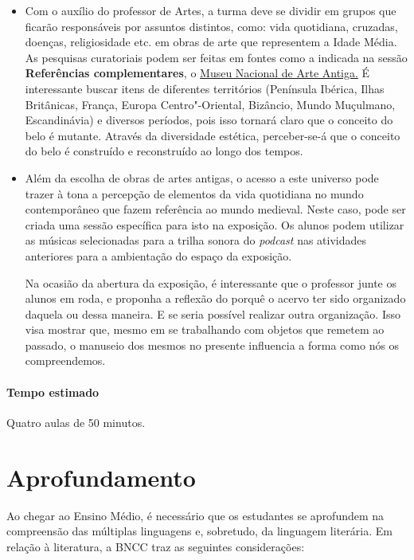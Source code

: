 \documentclass[12pt]{extarticle}
\begin{document}
\begin{itemize}

 		\item
 		Com o auxílio do professor de Artes, a turma deve se dividir em grupos
 		que ficarão responsáveis por assuntos distintos, como: vida quotidiana, 
 		cruzadas, doenças, religiosidade etc. em obras de arte que representem a Idade Média. 
 		As pesquisas curatoriais podem ser feitas em fontes como a indicada na 
 		sessão \textbf{Referências complementares}, o \href{https://artsandculture.google.com/partner/national-museum-of-ancient-art}{Museu Nacional de Arte Antiga.} 
 		É interessante buscar itens de diferentes territórios (Península
		Ibérica, Ilhas Britânicas, França, Europa Centro"-Oriental, Bizâncio,
		Mundo Muçulmano, Escandinávia) e diversos períodos, pois isso tornará
		claro que o conceito do belo é mutante. Através da diversidade estética,
		perceber-se-á que o conceito do belo é construído e reconstruído ao
		longo dos tempos.

\item 
		Além da escolha de obras de artes antigas, o acesso a este universo 
		pode trazer à tona a percepção de elementos da vida quotidiana no
		mundo contemporâneo que fazem referência ao mundo medieval. Neste caso,
		pode ser criada uma sessão específica para isto na exposição.
		Os alunos podem utilizar as músicas selecionadas para a trilha sonora 
		do \textit{podcast} nas atividades anteriores para a ambientação do espaço da exposição. 

		Na ocasião da abertura da exposição, é interessante que o professor junte 
		os alunos em roda, e proponha a reflexão do porquê o acervo ter sido organizado 
		daquela ou dessa maneira. E se seria possível realizar outra organização. Isso visa mostrar que,
		mesmo em se trabalhando com objetos que remetem ao passado, o manuseio
		dos mesmos no presente influencia a forma como nós os compreendemos.
 \end{itemize}

 \paragraph{Tempo estimado} Quatro aulas de 50 minutos.


\section{Aprofundamento}

Ao chegar ao Ensino Médio, é necessário que os estudantes se aprofundem
na compreensão das múltiplas linguagens e, sobretudo, da linguagem
literária. Em relação à literatura, a BNCC traz as seguintes
considerações:
\end{document}

